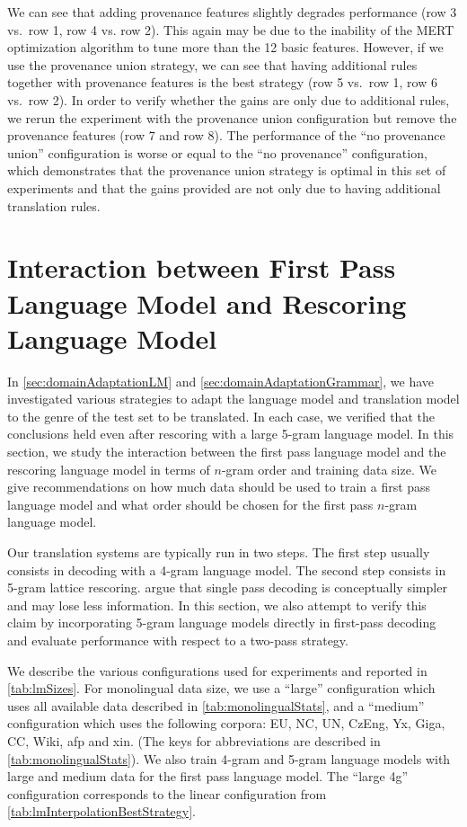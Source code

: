 %
We can see that adding provenance features slightly degrades
performance (row 3 vs.\ row 1, row 4 vs. row 2). This again
may be due to the inability of the MERT optimization algorithm to
tune more than the 12 basic features.
However, if we use the provenance union strategy, we can see that having additional
rules together with provenance features is the best
strategy (row 5 vs.\ row 1, row 6 vs.\ row 2).
In order to verify whether the gains are only due to additional
rules, we rerun the experiment with the provenance union configuration but
remove the provenance
features (row 7 and row 8). The performance of the ``no provenance union''
configuration is worse or equal to the ``no provenance'' configuration, which
demonstrates that the provenance union strategy is optimal in this set of experiments
and that the gains provided are not only due to having additional translation
rules.


\section{Interaction between First Pass Language Model and Rescoring Language Model}
\label{sec:bestPossibleRescoring}

In \autoref{sec:domainAdaptationLM} and \autoref{sec:domainAdaptationGrammar},
we have investigated various strategies to adapt the language model
and translation model to the genre of the test set to be translated.
In each case, we verified that the conclusions held even after
rescoring with a large 5-gram language model.
In this section, we study the interaction between the first pass language model
and the rescoring language model in terms of $n$-gram order and training
data size. We give recommendations on how much
data should be used to train a first pass language model
and what order should be chosen for the first pass
$n$-gram language model.

Our translation systems are typically run in two steps. The
first step usually consists in decoding with
a 4-gram language model. The second step consists
in 5-gram lattice rescoring.
\citet{brants-popat-xu-och-dean:2007:EMNLP-CoNLL} argue
that single pass decoding is conceptually simpler
and may lose less information.
In this section, we also attempt to verify this claim
by incorporating 5-gram language models directly in
first-pass decoding and evaluate performance with respect
to a two-pass strategy.

We describe the various configurations used for experiments and
reported in \autoref{tab:lmSizes}. For monolingual data size,
we use a ``large'' configuration which uses all available
data described in \autoref{tab:monolingualStats}, and a
``medium'' configuration which uses the following corpora: EU, NC, UN, CzEng, Yx, Giga, CC, Wiki, afp and xin.
(The keys for abbreviations are described in \autoref{tab:monolingualStats}).
We also train 4-gram and 5-gram language models with large and
medium data for the first pass language model.
The ``large 4g'' configuration corresponds to the linear
configuration from \autoref{tab:lmInterpolationBestStrategy}.

